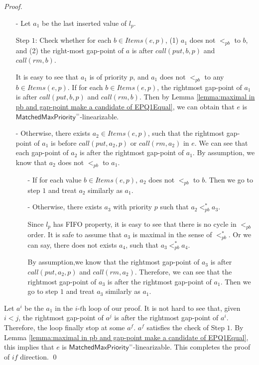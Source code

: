 \begin {proof}
\begin{itemize}
\item[-] Let $a_1$ be the last inserted value of $l_{p}$.

    Step $1$: Check whether for each $b \in \textit{Items}(e,p)$, (1) $a_1$ does not $<_{\textit{pb}}$ to $b$, and (2) the right-most gap-point of $a$ is after $\textit{call}(\textit{put},b,p)$ and $\textit{call}(\textit{rm},b)$.

    It is easy to see that $a_1$ is of priority $p$, and $a_1$ does not $<_{\textit{pb}}$ to any $b \in \textit{Items}(e,p)$. If for each $b \in \textit{Items}(e,p)$, the rightmost gap-point of $a_1$ is after $\textit{call}(\textit{put},b,p)$ and $\textit{call}(\textit{rm},b)$. Then by Lemma \ref{lemma:maximal in pb and gap-point make a candidate of EPQ1Equal}, we can obtain that $e$ is $\mathsf{MatchedMaxPriority}^{=}$-linearizable.


\item[-] Otherwise, there exists $a_2 \in \textit{Items}(e,p)$, such that the rightmost gap-point of $a_1$ is before $\textit{call}(\textit{put},a_2,p)$ or $\textit{call}(\textit{rm},a_2)$ in $e$. We can see that each gap-point of $a_2$ is after the rightmost gap-point of $a_1$.%
    By assumption, we know that $a_2$ does not $<_{\textit{pb}}$ to $a_1$.

    \begin{itemize}
    \setlength{\itemsep}{0.5pt}
    \item[-] If for each value $b \in \textit{Items}(e,p)$, $a_2$ does not $<_{\textit{pb}}$ to $b$. Then we go to step $1$ and treat $a_2$ similarly as $a_1$.
    \item[-] Otherwise, there exists $a_3$ with priority $p$ such that $a_2 <_{\textit{pb}}^* a_3$.

    Since $l_{p}$ has FIFO property, it is easy to see that there is no cycle in $<_{\textit{pb}}$ order. It is safe to assume that $a_3$ is maximal in the sense of $<_{\textit{pb}}^*$. Or we can say, there does not exists $a_4$, such that $a_3 <_{\textit{pb}}^* a_4$.

    By assumption,we know that the rightmost gap-point of $a_3$ is after $\textit{call}(\textit{put},a_2,p)$ and $\textit{call}(\textit{rm},a_2)$. Therefore, we can see that the rightmost gap-point of $a_3$ is after the rightmost gap-point of $a_1$. Then we go to step $1$ and treat $a_3$ similarly as $a_1$.
    \end{itemize}
\end{itemize}

Let $a^i$ be the $a_1$ in the $\textit{i-th}$ loop of our proof. It is not hard to see that, given $i<j$, the rightmost gap-point of $a^j$ is after the rightmost gap-point of $a^i$. Therefore, the loop finally stop at some $a^f$. $a^f$ satisfies the check of Step $1$. By Lemma \ref{lemma:maximal in pb and gap-point make a candidate of EPQ1Equal}, this implies that $e$ is $\mathsf{MatchedMaxPriority}^{=}$-linearizable. This completes the proof of $\textit{if}$ direction. \qed
\end {proof}



